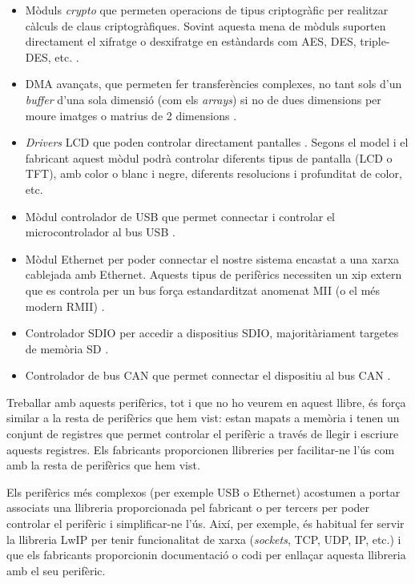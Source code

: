 \begin{itemize}
 \item Mòduls {\em crypto} que permeten operacions de tipus criptogràfic per realitzar càlculs de claus criptogràfiques. Sovint aquesta mena de mòduls suporten directament el xifratge o desxifratge en estàndards com AES, DES, triple-DES, etc. \cite[720]{STM32F4RM}\cite[772]{STM32F4RM}\cite[453]{EFM32TGRM}.
 \item \gls{DMA} avançats, que permeten fer transferències complexes, no tant sols d'un {\em buffer} d'una sola dimensió (com els {\em arrays}) si no de dues dimensions per moure imatges o matrius de 2 dimensions \cite[339]{STM32F4RM}.
 \item {\em Drivers} \gls{LCD} que poden controlar directament pantalles \cite[480]{STM32F4RM}\cite[490]{EFM32TGRM}. Segons el model i el fabricant aquest mòdul podrà controlar diferents tipus de pantalla (LCD o TFT), amb color o blanc i negre, diferents resolucions i profunditat de color, etc.
 \item Mòdul controlador de USB que permet connectar i controlar el microcontrolador al bus USB \cite[965]{STM32F4RM}\cite[1446]{EFM32GG11RM}.
 \item Mòdul Ethernet per poder connectar el nostre sistema encastat a una xarxa cablejada amb Ethernet. Aquests tipus de perifèrics necessiten un xip extern que es controla per un bus força estandarditzat anomenat \gls{MII} (o el més modern RMII) \cite[1121]{STM32F4RM}\cite[1729]{EFM32GG11RM} \cite{wiki:rmi}.
 \item Controlador \gls{SDIO} per accedir a dispositius SDIO, majoritàriament targetes de memòria SD \cite[1019]{STM32F4RM}\cite[1670]{EFM32GG11RM}.
 \item Controlador de bus \gls{CAN} que permet connectar el dispositiu al bus CAN \cite[1076]{STM32F4RM}\cite[1899]{EFM32GG11RM} \cite{wiki:can}.
\end{itemize}

Treballar amb aquests perifèrics, tot i que no ho veurem en aquest llibre, és força similar a la resta de perifèrics que hem vist: estan mapats a memòria i tenen un conjunt de registres que permet controlar el perifèric a través de llegir i escriure aquests registres. Els fabricants proporcionen llibreries per facilitar-ne l'ús com amb la resta de perifèrics que hem vist.

Els perifèrics més complexos (per exemple USB o Ethernet) acostumen a portar associats una llibreria proporcionada pel fabricant o per tercers per poder controlar el perifèric i simplificar-ne l'ús. Així, per exemple, és habitual fer servir la llibreria LwIP per tenir funcionalitat de xarxa ({\em sockets}, TCP, UDP, IP, etc.) \cite{lwip}\cite{wiki:lwip} i que els fabricants proporcionin documentació o codi per enllaçar aquesta llibreria amb el seu perifèric.

